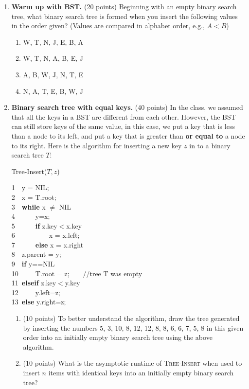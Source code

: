 \documentclass[12pt]{article}
\begin{document}
\begin{enumerate}
	\item \textbf{Warm up with BST.} (20 points) Beginning with an empty binary search tree, what binary search tree is formed when you insert the following values in the order given? (Values are compared in alphabet order, e.g., $A<B$)
		\begin{enumerate}
			\item W, T, N, J, E, B, A
			\item W, T, N, A, B, E, J
			\item A, B, W, J, N, T, E
			\item N, A, T, E, B, W, J
		\end{enumerate}

	\item \textbf{Binary search tree with equal keys.} (40 points) In the class, we assumed that all the keys in a BST are different from each other. However, the BST can still store keys of the same value, in this case, we put a key that is less than a node to its left, and put a key that is greater than \textbf{or equal to} a node to its right. Here is the algorithm for inserting a new key $z$ in to a binary search tree $T$:
	\begin{algorithm}
		\caption{Tree-Insert($T, z$)}
		1~~y = NIL;\\
		2~~x = T.root;\\
		3~~\textbf{while} x $\neq$ NIL\\
		4~~~~~~y=x;\\
		5~~~~~~\textbf{if} z.key$<$x.key\\
		6~~~~~~~~~~x = x.left;\\
		7~~~~~~\textbf{else} x = x.right\\
		8~~z.parent = y;\\
		9~~\textbf{if} y==NIL\\
		10~~~~~T.root = z;~~~~//tree T was empty\\
		11~\textbf{elseif} z.key$<$y.key\\
		12~~~~~y.left=z;\\
		13~\textbf{else} y.right=z;
	\end{algorithm}
		
	\begin{enumerate}
		\item (10 points) To better understand the algorithm, draw the tree generated by inserting the numbers 5, 3, 10, 8, 12, 12, 8, 8, 6, 6, 7, 5, 8 in this given order into an initially empty binary search tree using the above algorithm. 
		\item (10 points) What is the asymptotic runtime of \textsc{Tree-Insert} when used to insert $n$ items with identical keys into an initially empty binary search tree?
		

\end{enumerate}
\end{enumerate}
\end{document}
